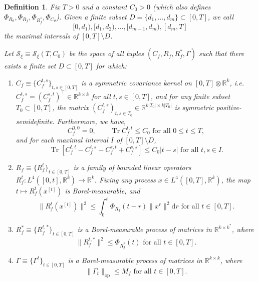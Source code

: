 \documentclass[10pt,a4paper]{amsart}
\newtheorem{defi}{Definition}
\def\Cf{C_f}
\def\Ct{C_\theta}
\def\R{\mathbb{R}}
\def\Rf{R_f}
\def\Rt{R_\theta}
\def\Tr{\operatorname{Tr}}
\def\d{\mathrm{d}}
\newcommand{\norm}[1]{\|#1\|}
\newcommand{\normop}[1]{\|#1\|_{\mathrm{op}}}
\def\pCt{\Phi_{\Ct}}
\def\pRf{\Phi_{\Rf}}
\def\pRfs{\Phi_{\Rf^*}}
\def\pRt{\Phi_{\Rt}}
\begin{document}
\begin{defi}\label{def:S}
Fix $T>0$ and a constant $C_0>0$ (which also defines $\pRt,\pRf,\pRfs,\pCt$).
Given a finite subset $D=\{d_1,\ldots,d_m\} \subset [0,T]$, we call
\[[0,d_1),[d_1,d_2),\ldots,[d_{m-1},d_m),[d_m,T]\]
the maximal intervals of $[0,T] \setminus D$.

Let $\mathcal{S}_\xi \equiv \mathcal{S}_\xi(T,C_0)$ be the space of all
tuples $(C_f,R_f,R_f^*,\Gamma)$ such that there exists a finite set
$D \subset [0,T]$ for which:
    \begin{enumerate}
        \item $\Cf \equiv \{\Cf^{t,s}\}_{t,s \in [0,T]}$ is a symmetric covariance kernel
on $[0,T] \otimes \R^k$, i.e.\ $\Cf^{t,s}=(\Cf^{s,t})^\top
\in \R^{k \times k}$ for all $t,s \in [0,T]$,
and for any finite subset $T_0 \subset [0,T]$,
the matrix $(\Cf^{t,s})_{t,s \in T_0} \in \R^{k|T_0| \times k|T_0|}$ is
symmetric positive-semidefinite. Furthermore, we have,
\[\Cf^{0,0}=0, \qquad
\Tr \Cf^{t,t} \leq C_0 \text{ for all } 0\leq t\leq T,\]
and for each maximal interval $I$ of $[0,T]\setminus D$,
        \begin{equation}\label{eq:Cfcontinuity}
\Tr[\Cf^{t,t}-\Cf^{t,s}-\Cf^{s,t}+\Cf^{s,s}] \leq C_0|t-s|
\text{ for all } t,s \in I.
        \end{equation}
        \item $\Rf \equiv \{\Rf^t\}_{t \in [0,T]}$ is a family of bounded linear operators
$\Rf^t:L^4([0,t],\R^k) \to \R^k$.
Fixing any process $x \in L^4([0,T],\R^k)$, the map
$t \mapsto R_f^t(x^{[t]})$ is Borel-measurable, and
        \begin{equation}\label{eq:pRf-volterra}
\norm{\Rf^{t}(x^{[t]})}^2 \leq \int_0^t \pRf(t-r) \norm{x^r}^2\d r \text{ for all }
t\in [0,T].
\end{equation}
\item $\Rf^* \equiv \{\Rf^{t,*}\}_{t \in [0,T]}$ is a Borel-measurable
process of matrices in $\R^{k \times k^*}$, where
\[\|\Rf^{t,*}\|^2 \leq \pRfs(t) \text{ for all } t \in [0,T].\]
\item $\Gamma \equiv \{\Gamma^t\}_{t \in [0,T]}$ is a Borel-measurable process
of matrices in $\R^{k \times k}$, where
\[\normop{\Gamma_t} \leq M_f \text{ for all } t \in [0,T].\]
    \end{enumerate}


\end{defi}
\end{document}
